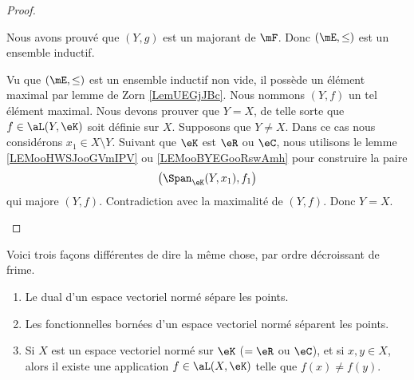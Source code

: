 \begin{proof}
\begin{subproof}
\begin{subproof}
				Nous avons prouvé que \( (Y,g)\) est un majorant de \( \mF\). Donc \( (\mE,\leq)\) est un ensemble inductif.
			\end{subproof}
			Vu que \( (\mE,\leq)\) est un ensemble inductif non vide, il possède un élément maximal par lemme de Zorn \ref{LemUEGjJBc}. Nous nommons \( (Y,f)\) un tel élément maximal.
			Nous devons prouver que \( Y=X\), de telle sorte que \( f\in\aL(Y,\eK)\) soit définie sur \( X\). Supposons que \( Y\neq X\). Dans ce cas nous considérons \( x_1\in X\setminus Y\). Suivant que \( \eK\) est \( \eR\) ou \( \eC\), nous utilisons le lemme \ref{LEMooHWSJooGVmIPV} ou \ref{LEMooBYEGooRswAmh} pour construire la paire
			\begin{equation}
				\big( \Span_{\eK}(Y,x_1),f_1 \big)
			\end{equation}
			qui majore \( (Y,f)\). Contradiction avec la maximalité de \( (Y,f)\). Donc \( Y=X\).
		\end{subproof}
	\end{proof}

	\begin{corollary}        \label{CORooOBDHooJpiBrs}
		Voici trois façons différentes de dire la même chose, par ordre décroissant de frime.
		\begin{enumerate}
			\item
			      Le dual d'un espace vectoriel normé sépare les points.
			\item
			      Les fonctionnelles bornées d'un espace vectoriel normé séparent les points.
			\item
			      Si \( X\) est un espace vectoriel normé sur \( \eK\) (\( =\eR\) ou \( \eC\)), et si \( x,y\in X\), alors il existe une application \( f\in\aL(X,\eK)\) telle que \( f(x)\neq f(y)\).
		\end{enumerate}
	\end{corollary}

